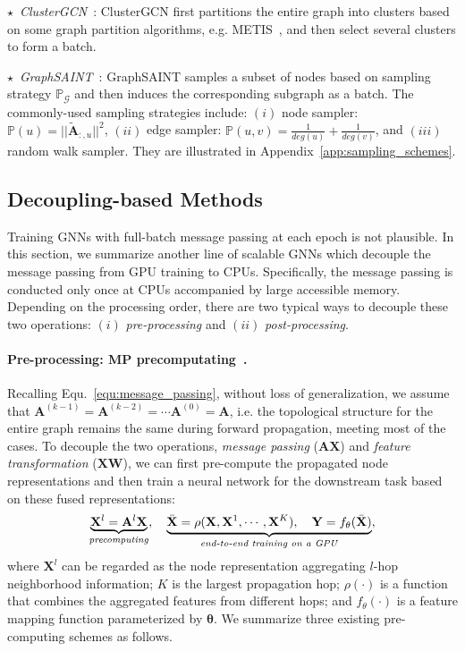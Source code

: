 \message{ !name(main.tex)}\documentclass{article}
\newcommand{\bm}[1]{\mathbf{#1}}
\begin{document}
\(\star\)~\textit{ClusterGCN}~\citep{chiang2019cluster}: ClusterGCN first partitions the entire graph into clusters based on some graph partition algorithms, e.g. METIS~\citep{karypis1998fast}, and then select several clusters to form a batch.

\(\star\)~\textit{GraphSAINT}~\citep{zeng2019graphsaint}: GraphSAINT samples a subset of nodes based on sampling strategy \(\mathbb{P}_{\mathcal{G}}\) and then induces the corresponding subgraph as a batch. The commonly-used sampling strategies include: \((i)\) node sampler: \(\mathbb{P}(u) = ||\widetilde{\bm{A}}_{:,u}||^2\), \((ii)\) edge sampler: \(\mathbb{P}(u, v) = \frac{1}{deg(u)} + \frac{1}{deg(v)}\), and \((iii)\) random walk sampler. They are illustrated in Appendix~\ref{app:sampling_schemes}.

\vspace{-2mm}
\subsection{Decoupling-based Methods}\label{sec:formu_decoupling}
\vspace{-2mm}
Training GNNs with full-batch message passing at each epoch is not plausible. In this section, we summarize another line of scalable GNNs which decouple the message passing from GPU training to CPUs. Specifically, the message passing is conducted only once at CPUs accompanied by large accessible memory. Depending on the processing order, there are two typical ways to decouple these two operations: $(i)$ \textit{pre-processing} and $(ii)$ \textit{post-processing}.

\vspace{-2mm}
\paragraph{Pre-processing: MP precomputating~\cite{wu2019simplifying,frasca2020sign,sun2021scalable}.} Recalling Equ.~\eqref{equ:message_passing}, without loss of generalization, we assume that $\bm{A}^{(k-1)} = \bm{A}^{(k-2)} = \cdots \bm{A}^{(0)} = \bm{A}$, i.e. the topological structure for the entire graph remains the same during forward propagation, meeting most of the cases. To decouple the two operations, \textit{message passing} ($\bm{A}\bm{X}$) and \textit{feature transformation} ($\bm{X}\bm{W}$), we can first pre-compute the propagated node representations and then train a neural network for the downstream task based on these fused representations:
\begin{align}\label{equ:precomputing}
	\underbrace{\bm{X}^l = \bm{A}^l \bm{X}}_{\text{\textit{precomputing}}},\quad \underbrace{\bar{\bm{X}} = \rho(\bm{X}, \bm{X}^{1}, \cdots, \bm{X}^K), \quad \bm{Y} = f_{\theta}(\bar{\bm{X}})}_{\text{\textit{end-to-end training on a GPU}}},
\end{align}
where $\bm{X}^l$ can be regarded as the node representation aggregating $l$-hop neighborhood information; $K$ is the largest propagation hop; $\rho(\cdot)$ is a function that combines the aggregated features from different hops; and $f_{\theta}(\cdot)$ is a feature mapping function parameterized by $\boldsymbol{\theta}$. We summarize three existing pre-computing schemes as follows.
\end{document}
